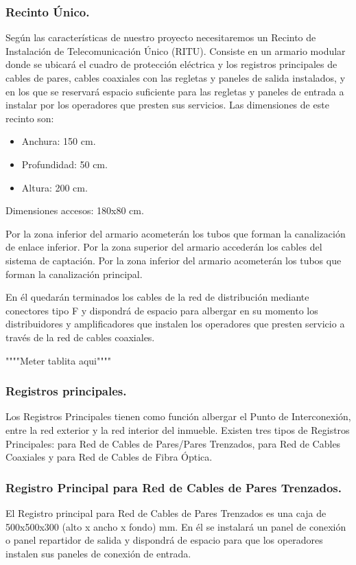 \subsubsection{Recinto Único.}
Según las características de nuestro proyecto necesitaremos un Recinto de Instalación de Telecomunicación Único (RITU). Consiste en un armario modular donde se ubicará el cuadro de protección eléctrica y los registros principales de cables de pares, cables coaxiales con las regletas y paneles de salida instalados, y en los que se reservará espacio suficiente para las regletas y paneles de entrada a instalar por los operadores que presten sus servicios.
Las dimensiones de este recinto son:
\begin{itemize}
	\item Anchura: 150 cm.
	\item Profundidad: 50 cm.
	\item Altura: 200 cm.
\end{itemize}
Dimensiones accesos: 180x80 cm.

Por la zona inferior del armario acometerán los tubos que forman la canalización de enlace inferior.
Por la zona superior del armario accederán los cables del sistema de captación.
Por la zona inferior del armario acometerán los tubos que forman la canalización principal.

En él quedarán terminados los cables de la red de distribución mediante conectores tipo F y dispondrá de espacio para albergar en su momento los distribuidores y amplificadores que instalen los operadores que presten servicio a través de la red de cables coaxiales.

""""Meter tablita aqui""""

\subsubsection{Registros principales.}
Los Registros Principales tienen como función albergar el Punto de Interconexión, entre la red exterior y la red interior del inmueble.
Existen tres tipos de Registros Principales: para Red de Cables de Pares/Pares Trenzados, para Red de Cables Coaxiales y para Red de Cables de Fibra Óptica.

\subsubsection*{Registro Principal para Red de Cables de Pares Trenzados.}
El Registro principal para Red de Cables de Pares Trenzados es una caja de 500x500x300 (alto x ancho x fondo) mm.
En él se instalará un panel de conexión o panel repartidor de salida y dispondrá de espacio para que los operadores instalen sus paneles de conexión de entrada.


